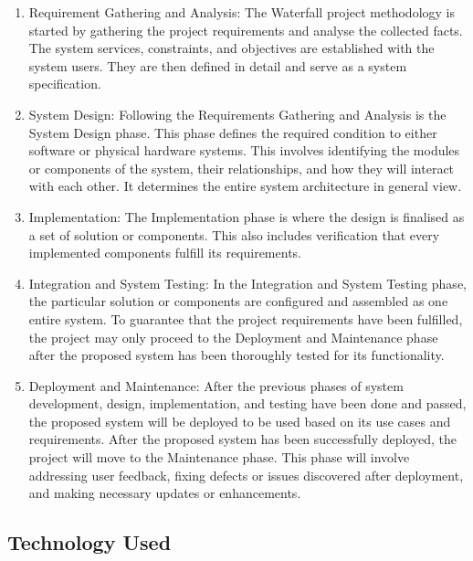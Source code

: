 \documentclass[conference]{IEEEtran}
\begin{document}
\begin{enumerate}

  \item Requirement Gathering and Analysis: The Waterfall project methodology is started by
    gathering the project requirements and analyse the collected facts. The system services,
    constraints, and objectives are established with the system users. They are then defined in
    detail and serve as a system specification.

  \item System Design: Following the Requirements Gathering and Analysis is the System Design phase.
    This phase defines the required condition to either software or physical hardware systems.  This
    involves identifying the modules or components of the system, their relationships, and how they
    will interact with each other. It determines the entire system architecture in general view.

  \item Implementation: The Implementation phase is where the design is finalised as a set of
    solution or components. This also includes verification that every implemented components
    fulfill its requirements.

  \item Integration and System Testing: In the Integration and System Testing phase, the particular
    solution or components are configured and assembled as one entire system. To guarantee that the
    project requirements have been fulfilled, the project may only proceed to the Deployment and
    Maintenance phase after the proposed system has been thoroughly tested for its functionality.

  \item Deployment and Maintenance: After the previous phases of system development, design,
    implementation, and testing have been done and passed, the proposed system will be deployed to
    be used based on its use cases and requirements. After the proposed system has been successfully
    deployed, the project will move to the Maintenance phase. This phase will involve addressing
    user feedback, fixing defects or issues discovered after deployment, and making necessary
    updates or enhancements.

\end{enumerate}

\subsection{Technology Used}
\end{document}
